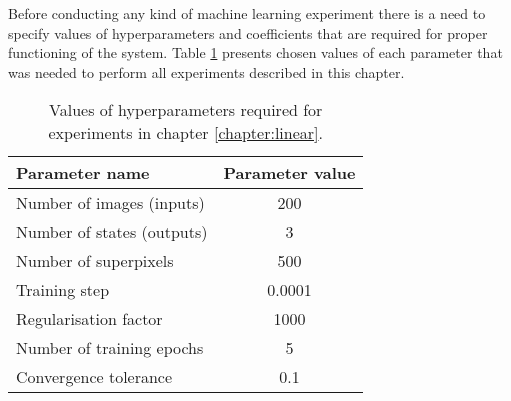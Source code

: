 Before conducting any kind of machine learning experiment there is a need to specify values of hyperparameters and coefficients that are required for proper functioning of the system. Table \ref{table:hyperparameters_linear} presents chosen values of each parameter that was needed to perform all experiments described in this chapter.
\begin{table}[ht]
    \caption{Values of hyperparameters required for experiments in chapter \ref{chapter:linear}.}
    \centering
    \begin{tabular}{|l|c|}
        \hline
        \rowcolor[HTML]{C0C0C0} 
        \textbf{Parameter name} & \textbf{Parameter value} \\ \hline
        Number of images (inputs) & 200 \\ \hline
        Number of states (outputs) & 3 \\ \hline
        Number of superpixels & 500 \\ \hline
        Training step & 0.0001 \\ \hline
        Regularisation factor & 1000 \\ \hline
        Number of training epochs & 5 \\ \hline
        Convergence tolerance & 0.1 \\ \hline
    \end{tabular}
    \label{table:hyperparameters_linear}
\end{table}

